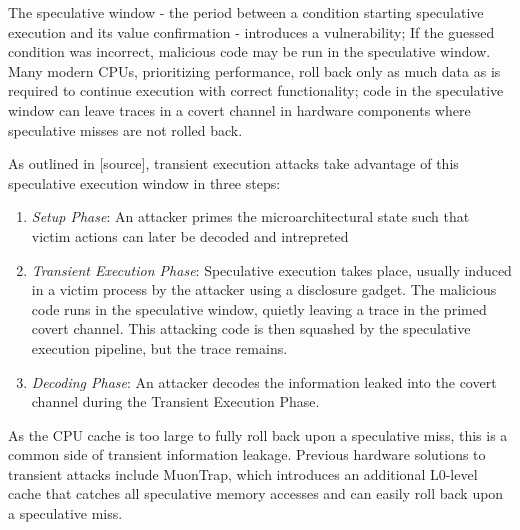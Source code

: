 The speculative window - the period between a condition starting speculative execution and its value confirmation -
introduces a vulnerability;
If the guessed condition was incorrect, malicious code may be run in the speculative window.
Many modern CPUs, prioritizing performance, roll back only as much data as is required to continue execution
with correct functionality; code in the speculative window can leave traces in a covert channel in hardware
components where speculative misses are not rolled back.

As outlined in [source], transient execution attacks take advantage of this speculative execution window in three steps:
\begin{enumerate}
    \item \textit{Setup Phase}:
An attacker primes the microarchitectural state such that victim actions can later be decoded and intrepreted
    \item \textit{Transient Execution Phase}:
Speculative execution takes place, usually induced in a victim process by the attacker using a disclosure gadget.
The malicious code runs in the speculative window, quietly leaving a trace in the primed covert channel.
This attacking code is then squashed by the speculative execution pipeline, but the trace remains.
    \item \textit{Decoding Phase}:
An attacker decodes the information leaked into the covert channel during the Transient Execution Phase.
\end{enumerate}

As the CPU cache is too large to fully roll back upon a speculative miss, this is a common side of transient information leakage.
Previous hardware solutions to transient attacks include MuonTrap,
which introduces an additional L0-level cache that catches all speculative memory accesses
and can easily roll back upon a speculative miss.

